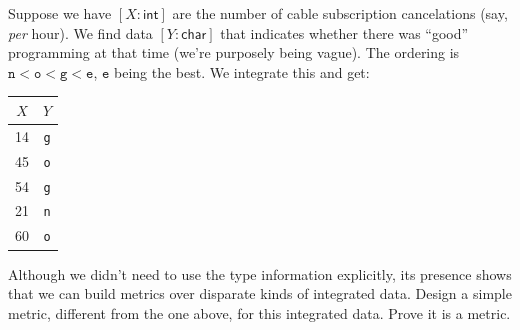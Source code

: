 \documentclass{article}
\begin{document}
Suppose we have $[X:\textsf{int}]$ are the number of cable subscription cancelations (say, {\it per} hour).  We find data $[Y:\textsf{char}]$ that  indicates whether there was  ``good'' programming at that time (we're purposely being vague).  The ordering is $\texttt{n} < \texttt{o} <  \texttt{g} < \texttt{e}$, $\texttt{e}$ being the best.  We integrate this and get:
\begin{center}
\begin{tabular}{cc}
$X$ & $Y$ \\ \hline \hline
14 & \texttt{g} \\
 45 & \texttt{o} \\
 54 & \texttt{g} \\
 21 & \texttt{n} \\
 60 & \texttt{o}
 \end{tabular}
 \end{center}
 Although we didn't need to use the type information explicitly, its presence shows that we can build metrics over disparate kinds of integrated data.   Design a simple metric, different from the one above, for this integrated data.  Prove it is a metric.
\end{document}
